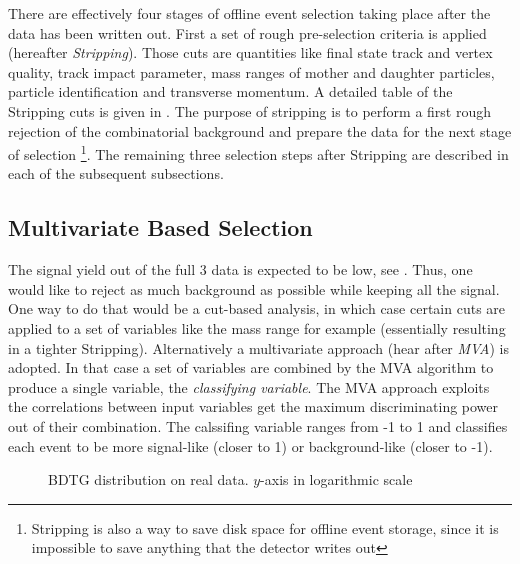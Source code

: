 
There are effectively four stages of offline event selection taking place after the data has been written out. 
First a set of rough pre-selection criteria is applied (hereafter {\it Stripping}). Those cuts are quantities like final state track and vertex quality,
track impact parameter, mass ranges of mother and daughter particles, particle identification and transverse momentum. A detailed 
table of the Stripping cuts is given in . The purpose of stripping is to perform a first rough rejection of the combinatorial
background and prepare the data for the next stage of selection \footnote{Stripping is also a way to save disk space for offline event storage, since it is impossible
to save anything that the detector writes out}. The remaining three selection steps after Stripping are described in each of the subsequent subsections.

\subsection{Multivariate Based Selection}
\label{Multivariate_Based_Selection}

The \BsJpsiKst signal yield out of the full 3 \invfb data is expected to be low, see . Thus, one would like to reject as much background as possible while keeping all the signal. 
One way to do that would be a cut-based analysis, in which case certain cuts are applied to a set of variables like the \Bs 
mass range for example (essentially resulting in a tighter Stripping). Alternatively a multivariate approach (hear after {\it MVA}) is adopted. 
In that case a set of variables are combined by the MVA algorithm to produce a single variable, the {\it classifying variable}. 
The MVA approach exploits the correlations between input variables get the maximum discriminating power out of their combination.
The calssifing variable ranges from -1 to 1 and classifies each event to be more signal-like (closer to 1) or background-like (closer to -1). 

\begin{figure}[h]
\begin{center}
  \scalebox{1}{}
  \caption{BDTG distribution on real data. $y$-axis in logarithmic scale}
  \label{BTDG_performance}
\end{center}
\end{figure}

